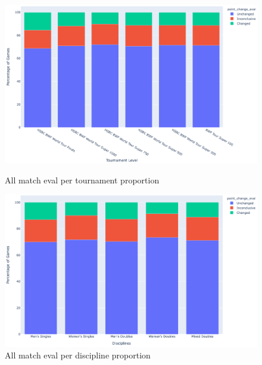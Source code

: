 \documentclass{mcmthesis}
\begin{document}
\begin{figure}[ht]
    \centering
    \begin{minipage}{0.35\textwidth}
        \centering
        \includegraphics[width=\textwidth]{figures/badminton/All_match_eval_per_tournament_proportion.png} %
        \caption{All match eval per tournament proportion}
        \label{fig:All match eval per tournament proportion}
    \end{minipage}
    \begin{minipage}{0.35\textwidth}
        \centering
        \includegraphics[width=\textwidth]{figures/badminton/All_match_eval_per_discipline_proportion.png} %
        \caption{All match eval per discipline proportion}
        \label{fig:All match eval per discipline proportion}
    \end{minipage}
    \begin{minipage}{0.3\textwidth}
        \centering

\end{minipage}
\end{figure}
\end{document}
